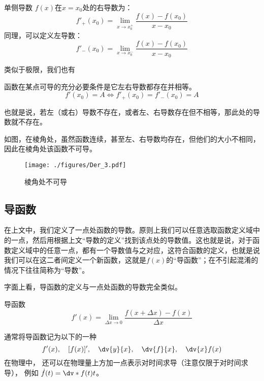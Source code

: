 \begin{definition}{单侧导数}\label{Der_def1}
$f(x)$在$x=x_0$处的右导数为：
\begin{equation}
f'_+(x_0) = \lim_{x\to x_0^+} \frac{f(x)-f(x_0)}{x-x_0}
\end{equation}
同理，可以定义左导数：
\begin{equation}
f'_-(x_0) = \lim_{x\to x_0^-} \frac{f(x)-f(x_0)}{x-x_0}
\end{equation}
\end{definition}

类似于极限，我们也有
\begin{theorem}{}
函数在某点可导的充分必要条件是它左右导数都存在并相等。
$$f'(x_0)=A\Longleftrightarrow f'_+(x_0)=f'_-(x_0)=A$$

也就是说，若左（或右）导数不存在，或者左、右导数存在但不相等，那此处的导数就不存在。
\end{theorem}

\begin{example}{}
如图，在棱角处，虽然函数连续，甚至左、右导数均存在，但他们的大小不相同，因此在棱角处该函数不可导。
\begin{figure}[ht]
\centering
\texttt{[image: ./figures/Der\_3.pdf]}
\caption{棱角处不可导}
\end{figure}

\end{example}
\subsection{导函数}
在上文中，我们定义了一点处函数的导数。原则上我们可以任意选取函数定义域中的一点，然后用根据上文“导数的定义”找到该点处的导数值。这也就是说，对于函数定义域中的任意一点，都有一个导数值与之对应，这符合函数的定义，也就是说我们可以在这二者间定义一个新函数，这就是$f(x)$的“导函数”；在不引起混淆的情况下往往简称为“导数”。

字面上看，导函数的定义与一点处函数的导数完全类似。
\begin{definition}{导函数}
\begin{equation}
f'(x)=\lim_{\Delta x \to 0}\frac{f(x+\Delta x)-f(x)}{\Delta x}
\end{equation}
\end{definition}

通常将导函数记为以下的一种%
\begin{equation}\label{Der_eq1}
f'(x),\quad [f(x)]',\quad \dv{y}{x},\quad \dv{f}{x},\quad \dv{x}f(x)
\end{equation}
在物理中， 还可以在物理量上方加一点表示对时间求导（注意仅限于对时间求导）， 例如 $\dot f(t) = \dv*{f(t)}{t}$。

